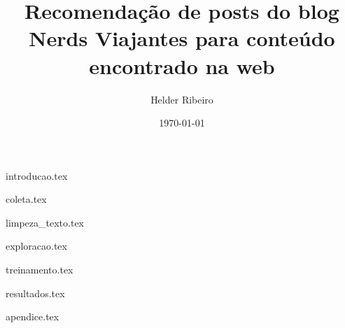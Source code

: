 \documentclass{article}
\title{Recomendação de posts do blog Nerds Viajantes para conteúdo encontrado na web}
\author{Helder Ribeiro}
\date{\today}
\begin{document}

\maketitle

\pagebreak

\tableofcontents{}

{introducao.tex}

{coleta.tex}

{limpeza_texto.tex}

{exploracao.tex}

{treinamento.tex}



{resultados.tex}





{apendice.tex}
\end{document}
